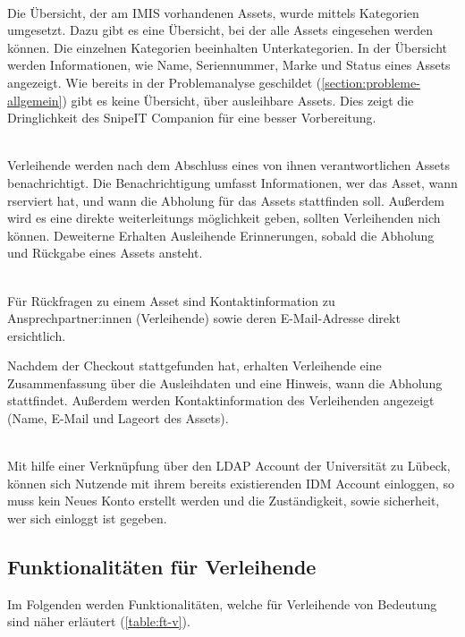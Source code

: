 {\sffamily\color{maincolor}{Ft-VA-1 | Übersicht über ausleihbare Assets }}\\
Die Übersicht, der am IMIS vorhandenen Assets, wurde mittels
Kategorien umgesetzt. Dazu gibt es eine Übersicht, bei der alle Assets
eingesehen werden können. Die einzelnen Kategorien beeinhalten Unterkategorien.
In der Übersicht werden Informationen, wie Name, Seriennummer, Marke und Status
eines Assets angezeigt. Wie bereits in der Problemanalyse geschildet
(\ref{section:probleme-allgemein}) gibt es keine Übersicht, über ausleihbare
Assets. Dies zeigt die Dringlichkeit des SnipeIT Companion für eine besser
Vorbereitung.

    {\sffamily\color{maincolor}{Ft-VA-2 | Benachrichtigungen \& Erinnerungen   }}\\
Verleihende werden nach dem Abschluss eines von ihnen verantwortlichen Assets
benachrichtigt. Die Benachrichtigung umfasst Informationen, wer das Asset, wann
rserviert hat, und wann die Abholung für das Assets stattfinden soll. Außerdem
wird es eine direkte weiterleitungs möglichkeit geben, sollten Verleihenden nich
können. Deweiterne Erhalten Ausleihende Erinnerungen, sobald die Abholung und
Rückgabe eines Assets ansteht.

    {\sffamily\color{maincolor}{Ft-VA-3 | Sichtbarkeit von Ansprechpartner:innen}}\\
Für Rückfragen zu einem Asset sind Kontaktinformation zu Ansprechpartner:innen
(Verleihende) sowie deren E-Mail-Adresse direkt ersichtlich.

Nachdem der Checkout stattgefunden hat, erhalten Verleihende eine
Zusammenfassung über die Ausleihdaten und eine  Hinweis, wann die Abholung
stattfindet. Außerdem werden Kontaktinformation des Verleihenden angezeigt
(Name, E-Mail und Lageort des Assets).


    {\sffamily\color{maincolor}{Ft-VA-4 | Authentifizierung per IDM Account}}\\
Mit hilfe einer Verknüpfung über den LDAP Account der Universität zu Lübeck,
können sich Nutzende mit ihrem bereits existierenden IDM Account einloggen, so
muss kein Neues Konto erstellt werden und die Zuständigkeit, sowie sicherheit,
wer sich einloggt ist gegeben.

\subsection{Funktionalitäten für Verleihende}
Im Folgenden werden Funktionalitäten, welche für Verleihende von Bedeutung sind
näher erläutert (\ref{table:ft-v}).

